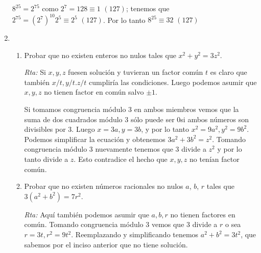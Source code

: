 \documentclass[12pt,spanish,makeidx]{amsbook}
\newcommand{\rta}{\noindent\textit{Rta: }}
\newcommand{\espm}{{\,\,}}
\begin{document}
\begin{enumerate}
	$8^{25}=2^{75}$ como $2^7=128\equiv1 \espm(127)$; tenemos que $2^{75}=(2^7)^{10}2^5\equiv2^5 \espm(127)$.
	Por lo tanto $8^{25}\equiv32 \espm(127)$
	
	
	
	
	
	
	
	
	
	
	\smallskip
	\item \begin{enumerate}
		\item Probar que no existen enteros no nulos tales que $x^2 + y^2 = 3z^2$.
			
		\rta Si $x, y, z$ fuesen solución y tuvieran un factor común $t$ es claro que también $x/t, y/t. z/t$ cumpliría las condiciones. Luego podemos asumir que $x, y, z$ no tienen factor en común salvo $\pm1$.
		
		Si tomamos congruencia módulo 3 en ambos miembros vemos que la suma de dos cuadrados módulo 3 sólo puede ser 0si ambos números son divisibles por 3. Luego $x=3a, y=3b$, y por lo tanto $x^2=9a^2, y^2=9b^2$. Podemos simplificar la ecuación y obtenemos $3a^2+3b^2=z^2$. Tomando congruencia módulo 3 nuevamente tenemos que 3 divide a $z^2$ y por lo tanto divide a $z$. Esto contradice el hecho que $x,y, z$ no tenían factor común. 
		
		\item Probar que no existen números racionales no nulos $a$, $b$, $r$ tales que $3(a^2 + b^2) = 7r^2$.
			
		\rta Aquí también podemos asumir que $a, b, r$ no tienen factores en común. Tomando congruencia módulo 3 vemos que 3 divide a $r$ o sea $r=3t, r^2=9t^2$. Reemplazando y simplificando tenemos $a^2+b^2=3t^2$, que sabemos por el inciso anterior que no tiene solución.
		

\end{enumerate}
\end{enumerate}
\end{document}
